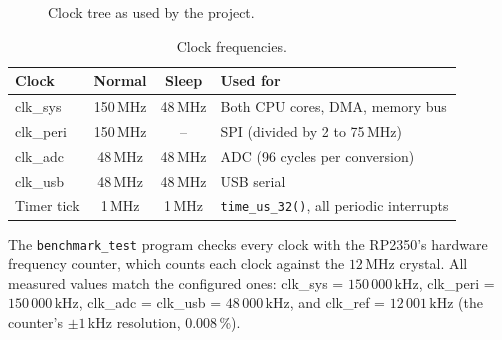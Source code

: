\documentclass[11pt,a4paper]{article}
\newcommand{\unit}[2]{\ensuremath{#1\,\mathrm{#2}}}
\begin{document}
\begin{figure}[H]
\centering
{}
\caption{Clock tree as used by the project.}\label{fig:clocks}
\end{figure}

\begin{table}[H]
\centering
\caption{Clock frequencies.}\label{tab:clocks}
\begin{tabular}{lccl}
\toprule
\textbf{Clock} & \textbf{Normal} & \textbf{Sleep} & \textbf{Used for} \\
\midrule
clk\_sys & 150\,MHz & 48\,MHz & Both CPU cores, DMA, memory bus \\
clk\_peri & 150\,MHz & -- & SPI (divided by 2 to 75\,MHz) \\
clk\_adc & 48\,MHz & 48\,MHz & ADC (96 cycles per conversion) \\
clk\_usb & 48\,MHz & 48\,MHz & USB serial \\
Timer tick & 1\,MHz & 1\,MHz & \texttt{time\_us\_32()}, all periodic interrupts \\
\bottomrule
\end{tabular}
\end{table}

\noindent The \texttt{benchmark\_test} program checks every clock with the
RP2350's hardware frequency counter, which counts each clock against the
\unit{12}{MHz} crystal. All measured values match the configured ones:
clk\_sys = \unit{150\,000}{kHz}, clk\_peri = \unit{150\,000}{kHz},
clk\_adc = clk\_usb = \unit{48\,000}{kHz}, and clk\_ref = \unit{12\,001}{kHz}
(the counter's $\pm1$\,kHz resolution, 0.008\,\%).
\end{document}
